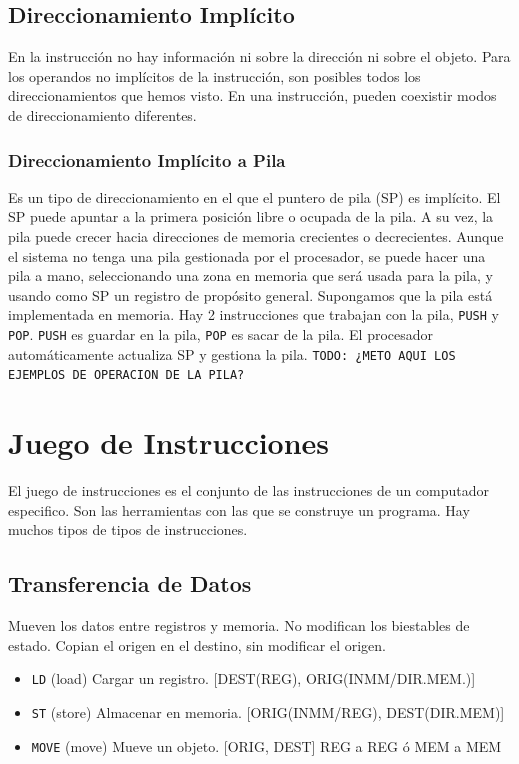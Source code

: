 \documentclass[a4paper,11pt,spanish]{report}
\begin{document}
\subsection{Direccionamiento Implícito}
En la instrucción no hay información ni sobre la dirección ni sobre el objeto. Para los operandos no implícitos de la instrucción, son posibles todos los direccionamientos que hemos visto. En una instrucción, pueden coexistir modos de direccionamiento diferentes.
\subsubsection{Direccionamiento Implícito a Pila}
Es un tipo de direccionamiento en el que el puntero de pila (SP) es implícito. El SP puede apuntar a la primera posición libre o ocupada de la pila. A su vez, la pila puede crecer hacia direcciones de memoria crecientes o decrecientes.
Aunque el sistema no tenga una pila gestionada por el procesador, se puede hacer una pila a mano, seleccionando una zona en memoria que será usada para la pila, y usando como SP un registro de propósito general.
Supongamos que la pila está implementada en memoria. Hay 2 instrucciones que trabajan con la pila, \verb|PUSH| y \verb|POP|. \verb|PUSH| es guardar en la pila, \verb|POP| es sacar de la pila. El procesador automáticamente actualiza SP y gestiona la pila.
\verb|TODO: ¿METO AQUI LOS EJEMPLOS DE OPERACION DE LA PILA?|
\section{Juego de Instrucciones}
El juego de instrucciones es el conjunto de las instrucciones de un computador especifico. Son las herramientas con las que se construye un programa. Hay muchos tipos de tipos de instrucciones.
\subsection{Transferencia de Datos}
Mueven los datos entre registros y memoria. No modifican los biestables de estado. Copian el origen en el destino, sin modificar el origen.
\begin{itemize}
\item \verb|LD| (load) Cargar un registro. [DEST(REG), ORIG(INMM/DIR.MEM.)]
\item \verb|ST| (store) Almacenar en memoria. [ORIG(INMM/REG), DEST(DIR.MEM)]
\item \verb|MOVE| (move) Mueve un objeto. [ORIG, DEST]  REG a REG ó MEM a MEM
\end{itemize}
\end{document}
